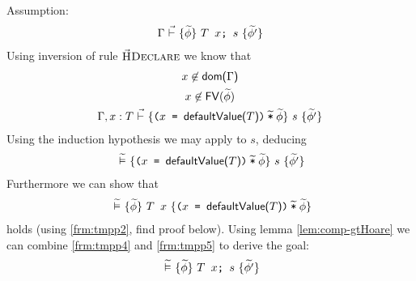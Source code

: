 \begin{proofatend}
    Assumption:
    \begin{align}
    {\Gamma} \,\,\vec{\vdash}\,\, \{{\widetilde{\phi}}\} ~{\textup{\texttt{{\textup{\texttt{${T}$~${x}$}}};~{$s$}}}}~ \{{\widetilde{\phi'}}\}
    \end{align}
    Using inversion of rule $\textup{\textsc{\ensuremath{\vec{\text{H}}}Declare}}$ we know that
    \begin{gather}
    \label{frm:tmpp1}
    {x} \not\in \textup{\textmd{\textsf{dom($\Gamma$)}}} \\
    \label{frm:tmpp2}
    {x} \not \in {\textup{\textmd{\textsf{FV}}}(\widetilde{\phi})} \\
    {{\Gamma}, {x} : {T}} \,\,\vec{\vdash}\,\, \{{\textup{\texttt{${\textup{\texttt{(${\textup{\texttt{${x}$}}}$ = ${\textup{\texttt{${\textup{\textmd{\textsf{defaultValue(${T}$)}}}}$}}}$)}}}$\:$\widetilde{\textup{\texttt{*}}}$\:$\widetilde{\phi}$}}}\} ~{s}~ \{{\widetilde{\phi'}}\}
    \end{gather}
    Using the induction hypothesis we may apply  to $s$, deducing
    \begin{gather}
    \label{frm:tmpp4}
    {} \,\,\widetilde{\vDash}\,\, \{{\textup{\texttt{${\textup{\texttt{(${\textup{\texttt{${x}$}}}$ = ${\textup{\texttt{${\textup{\textmd{\textsf{defaultValue(${T}$)}}}}$}}}$)}}}$\:$\widetilde{\textup{\texttt{*}}}$\:$\widetilde{\phi}$}}}\} ~{s}~ \{{\widetilde{\phi'}}\}
    \end{gather}
    Furthermore we can show that
    \begin{gather}
    \label{frm:tmpp5}
    {} \,\,\widetilde{\vDash}\,\, \{{\widetilde{\phi}}\} ~{\textup{\texttt{${T}$~${x}$}}}~ \{{\textup{\texttt{${\textup{\texttt{(${\textup{\texttt{${x}$}}}$ = ${\textup{\texttt{${\textup{\textmd{\textsf{defaultValue(${T}$)}}}}$}}}$)}}}$\:$\widetilde{\textup{\texttt{*}}}$\:$\widetilde{\phi}$}}}\}
    \end{gather}
    holds (using \ref{frm:tmpp2}, find proof below).
    Using lemma \ref{lem:comp-gtHoare} we can combine \ref{frm:tmpp4} and \ref{frm:tmpp5} to derive the goal:
    \begin{align}
    {} \,\,\widetilde{\vDash}\,\, \{{\widetilde{\phi}}\} ~{\textup{\texttt{{\textup{\texttt{${T}$~${x}$}}};~{$s$}}}}~ \{{\widetilde{\phi'}}\}
    \end{align}
    

\end{proofatend}
